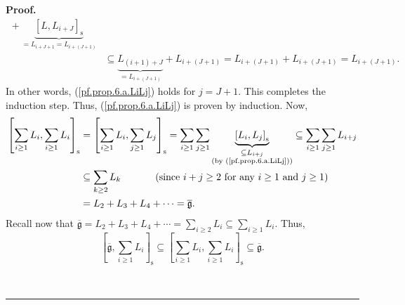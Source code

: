\documentclass[numbers=enddot,12pt,final,onecolumn,notitlepage]{scrartcl}%
\theoremstyle{definition}
\newenvironment{proof}[1][Proof]{\noindent\textbf{#1.} }{\ \rule{0.5em}{0.5em}}
\let\sumnonlimits\sum
\renewcommand{\sum}{\sumnonlimits\limits}
\begin{document}
\begin{proof}
{\begin{align*}
{{}}+\underbrace{\left[  L,L_{i+J}\right]  _{\operatorname*{s}}}_{=L_{i+J+1}%
=L_{i+\left(  J+1\right)  }}\\
&  \subseteq\underbrace{L_{\left(  i+1\right)  +J}}_{=L_{i+\left(  J+1\right)
}}+L_{i+\left(  J+1\right)  }=L_{i+\left(  J+1\right)  }+L_{i+\left(
J+1\right)  }=L_{i+\left(  J+1\right)  }.
\end{align*}
In other words, (\ref{pf.prop.6.a.LiLj}) holds for $j=J+1$. This completes the
induction step. Thus, (\ref{pf.prop.6.a.LiLj}) is proven by induction.} Now,%
\begin{align*}
\left[  \sum_{i\geq1}L_{i},\sum_{i\geq1}L_{i}\right]  _{\operatorname*{s}}  &
=\left[  \sum_{i\geq1}L_{i},\sum_{j\geq1}L_{j}\right]  _{\operatorname*{s}%
}=\sum_{i\geq1}\sum_{j\geq1}\underbrace{\left[  L_{i},L_{j}\right]
_{\operatorname*{s}}}_{\substack{\subseteq L_{i+j}\\\text{(by
(\ref{pf.prop.6.a.LiLj}))}}}\subseteq\sum_{i\geq1}\sum_{j\geq1}L_{i+j}\\
&  \subseteq\sum_{k\geq2}L_{k}\ \ \ \ \ \ \ \ \ \ \left(  \text{since }%
i+j\geq2\text{ for any }i\geq1\text{ and }j\geq1\right) \\
&  =L_{2}+L_{3}+L_{4}+\cdots=\overline{\mathfrak{g}}.
\end{align*}
Recall now that $\overline{\mathfrak{g}}=L_{2}+L_{3}+L_{4}+\cdots=\sum
_{i\geq2}L_{i}\subseteq\sum_{i\geq1}L_{i}$. Thus,%
\[
\left[  \overline{\mathfrak{g}},\sum_{i\geq1}L_{i}\right]  _{\operatorname*{s}%
}\subseteq\left[  \sum_{i\geq1}L_{i},\sum_{i\geq1}L_{i}\right]
_{\operatorname*{s}}\subseteq\overline{\mathfrak{g}}.
\]



\end{proof}
\end{document}
